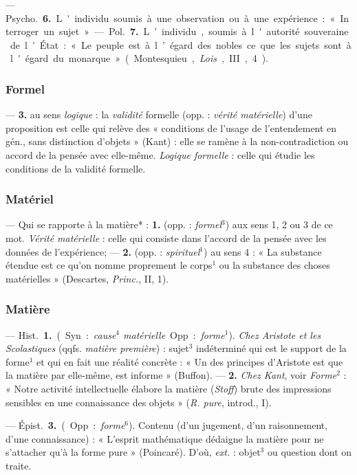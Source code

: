 — \si{Psycho.} {\bf 6.} L'individu soumis
à une observation ou à une expérience : « Interroger un sujet. »

— \si{Pol.} {\bf 7.} L’individu, soumis à l'autorité souveraine de l'État :
« Le peuple est à l’égard des nobles ce que les sujets sont à l'égard du
monarque » (Montesquieu, {\it Lois}, III, 4).


\subsubsection{Formel}
 — {\bf 3.} au sens {\it logique} : la {\it validité} formelle
(opp. : {\it vérité matérielle}) d’une proposition est celle qui relève des
« conditions de l’usage de l’entendement en gén., sans distinction
d'objets » (Kant) : elle se ramène à la non-contradiction ou accord de la
pensée avec elle-même. {\it Logique formelle} : celle qui étudie les
conditions de la validité formelle.

\subsubsection{Matériel}
 — Qui se rapporte à la matière* : {\bf 1.} (opp. :
{\it formel}$^3$) aux sens 1, 2 ou 3 de ce mot. {\it Vérité matérielle} :
celle qui consiste dans l’accord de la pensée avec les données de
l’expérience; — {\bf 2.} (opp. : {\it spirituel}$^1$) au sens 4 : « La
substance étendue est ce qu’on nomme proprement le corps$^1$ ou la substance
des choses matérielles » (Descartes, {\it Princ.}, II, 1).

\subsubsection{Matière}
 — \si{Hist.} {\bf 1.} (Syn. : {\it cause$^4$ matérielle}. Opp. :
{\it forme}$^1$). {\it Chez Aristote et les Scolastiques} (qqfs. {\it matière
première}) : sujet$^3$ indéterminé qui est le support de la forme$^1$ et qui
en fait une réalité concrète : « Un des principes d’Aristote est que la
matière par elle-même, est informe » (Buffon). — {\bf 2.} {\it Chez Kant},
voir {\it Forme}$^2$ :
« Notre activité intellectuelle élabore la matière ({\it Stoff}) brute des
impressions sensibles en une connaissance des objets » ({\it R. pure},
introd., I).

— \si{Épist.} {\bf 3.} (Opp. : {\it forme}$^6$). Contenu (d'un jugement, d’un
raisonnement, d’une connaissance) : « L’esprit mathématique dédaigne la
matière pour ne s’attacher qu'à la forme pure » (Poincaré). D'où,
{\it ext.} : objet$^3$ ou question dont on traite.

